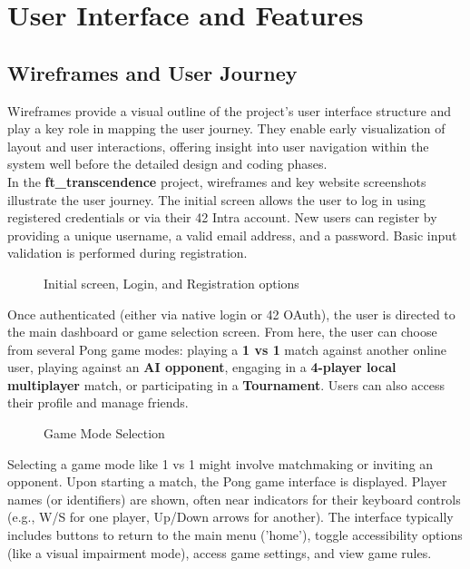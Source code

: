 \chapter{User Interface and Features}
\label{ch:ui}

\section{Wireframes and User Journey}

Wireframes provide a visual outline of the project’s user interface structure and play a key role in mapping the user journey. They enable early visualization of layout and user interactions, offering insight into user navigation within the system well before the detailed design and coding phases.\\
In the \textbf{ft\_transcendence} project, wireframes and key website screenshots illustrate the user journey. The initial screen allows the user to log in using registered credentials or via their 42 Intra account. New users can register by providing a unique username, a valid email address, and a password. Basic input validation is performed during registration.

\begin{figure}[H]
    \caption{Initial screen, Login, and Registration options}
    \label{fig:init-screen}
\end{figure}

Once authenticated (either via native login or 42 OAuth), the user is directed to the main dashboard or game selection screen. From here, the user can choose from several Pong game modes: playing a \textbf{1 vs 1} match against another online user, playing against an \textbf{AI opponent}, engaging in a \textbf{4-player local multiplayer} match, or participating in a \textbf{Tournament}. Users can also access their profile and manage friends.

\begin{figure}[H]
    \caption{Game Mode Selection}
    \label{fig:game-selection}
\end{figure}

Selecting a game mode like 1 vs 1 might involve matchmaking or inviting an opponent. Upon starting a match, the Pong game interface is displayed. Player names (or identifiers) are shown, often near indicators for their keyboard controls (e.g., W/S for one player, Up/Down arrows for another). The interface typically includes buttons to return to the main menu ('home'), toggle accessibility options (like a visual impairment mode), access game settings, and view game rules.

